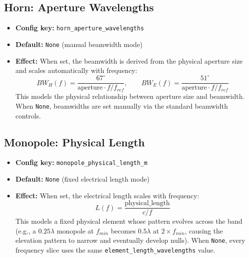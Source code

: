 \documentclass[11pt,a4paper]{article}
\begin{document}
\subsection{Horn: Aperture Wavelengths}
\begin{itemize}
    \item \textbf{Config key:} \texttt{horn\_aperture\_wavelengths}
    \item \textbf{Default:} \texttt{None} (manual beamwidth mode)
    \item \textbf{Effect:} When set, the beamwidth is derived from the physical aperture size and scales automatically with frequency:
    \[ BW_H(f) = \frac{67^\circ}{\text{aperture} \cdot f/f_{ref}}, \qquad BW_E(f) = \frac{51^\circ}{\text{aperture} \cdot f/f_{ref}} \]
    This models the physical relationship between aperture size and beamwidth. When \texttt{None}, beamwidths are set manually via the standard beamwidth controls.
\end{itemize}

\subsection{Monopole: Physical Length}
\begin{itemize}
    \item \textbf{Config key:} \texttt{monopole\_physical\_length\_m}
    \item \textbf{Default:} \texttt{None} (fixed electrical length mode)
    \item \textbf{Effect:} When set, the electrical length scales with frequency:
    \[ L(f) = \frac{\text{physical\_length}}{c / f} \]
    This models a fixed physical element whose pattern evolves across the band (e.g., a $0.25\lambda$ monopole at $f_{min}$ becomes $0.5\lambda$ at $2 \times f_{min}$, causing the elevation pattern to narrow and eventually develop nulls). When \texttt{None}, every frequency slice uses the same \texttt{element\_length\_wavelengths} value.
\end{itemize}
\end{document}
